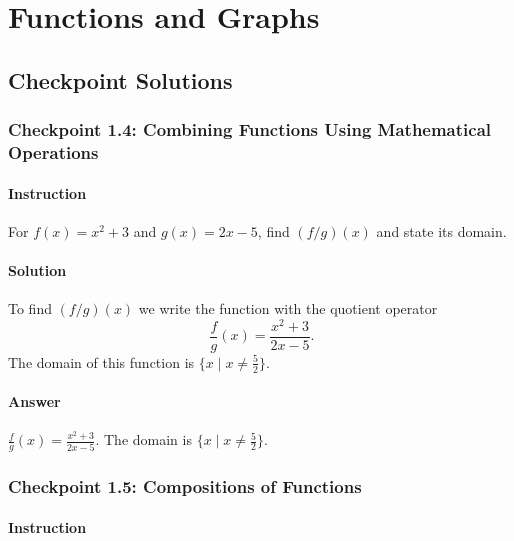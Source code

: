 \documentclass[11pt, letterpaper, oneside]{memoir}
\begin{document}
\chapter{Functions and Graphs}

\section*{Checkpoint Solutions}





\subsection*{Checkpoint 1.4: Combining Functions Using Mathematical Operations}

\subsubsection{Instruction}

For $ f(x) = x^2 + 3 $ and $ g(x) = 2x - 5 $, find $ (f/g)(x) $ and state its domain.

\subsubsection{Solution}

To find $ (f/g)(x) $ we write the function with the quotient operator
$$ \phantom{.}
\frac{f}{g}(x) = \frac{x^2 + 3}{2x - 5}
.$$
The domain of this function is $ \{ x \mid x \ne \frac{5}{2} \} $.

\subsubsection{Answer}

$ \frac{f}{g}(x) = \frac{x^2 + 3}{2x - 5} $. The domain is $ \{ x \mid x \ne \frac{5}{2} \} $.

\subsection*{Checkpoint 1.5: Compositions of Functions}

\subsubsection{Instruction}
\end{document}
